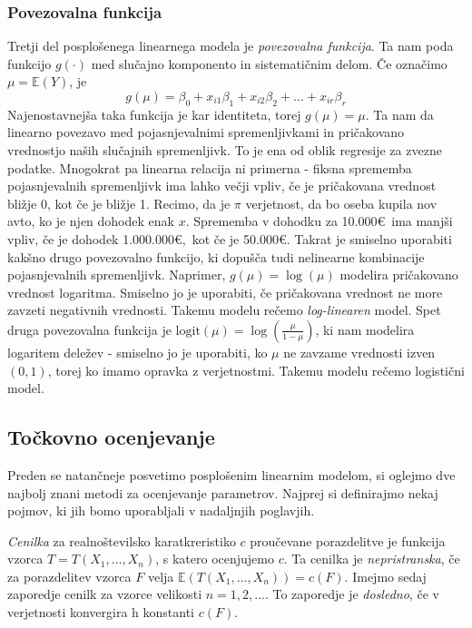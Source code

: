 \documentclass[12pt,a4paper]{amsart}
\theoremstyle{definition} %
\theoremstyle{plain} %
\begin{document}
\subsubsection{Povezovalna funkcija}
Tretji del posplošenega linearnega modela je \textit{povezovalna funkcija}. Ta nam poda funkcijo $g(\cdot)$ med slučajno komponento
in sistematičnim delom. Če označimo $\mu = \mathbb{E}(Y)$, je
\[
    g(\mu) = \beta_{0} + x_{i1}\beta_{1} + x_{i2}\beta_{2} + \ldots + x_{ir}\beta_{r}
\]
Najenostavnejša taka funkcija je kar identiteta, torej $g(\mu) = \mu$. Ta nam da linearno povezavo med pojasnjevalnimi spremenljivkami 
in pričakovano vrednostjo naših slučajnih spremenljivk. To je ena od oblik regresije za zvezne podatke.
Mnogokrat pa linearna relacija ni primerna - fiksna sprememba pojasnjevalnih spremenljivk ima lahko večji vpliv, če je pričakovana vrednost 
bližje 0, kot če je bližje 1. Recimo, da je $\pi$ verjetnost, da bo oseba kupila nov avto, ko je njen dohodek enak $x$. Sprememba v dohodku
za 10.000\euro~ima manjši vpliv, če je dohodek 1.000.000\euro,~kot če je 50.000\euro.
Takrat je smiselno uporabiti kakšno drugo povezovalno funkcijo, ki dopušča tudi nelinearne kombinacije pojasnjevalnih
spremenljivk. Naprimer, $g(\mu) = \log(\mu)$ modelira
pričakovano vrednost logaritma. Smiselno jo je uporabiti, če pričakovana vrednost ne more zavzeti negativnih vrednosti. Takemu modelu rečemo
\textit{log-linearen} model.
Spet druga povezovalna funkcija je $\mathrm{logit}(\mu) = \log(\frac{\mu}{1-\mu})$, ki nam modelira logaritem deležev - smiselno jo je uporabiti, 
ko $\mu$ ne zavzame vrednosti izven $(0,1)$, torej ko imamo opravka z verjetnostmi. Takemu modelu rečemo logistični model.
\subsection{Točkovno ocenjevanje}
Preden se natančneje posvetimo posplošenim linearnim modelom, si oglejmo dve najbolj znani metodi za ocenjevanje parametrov.
Najprej si definirajmo nekaj pojmov, ki jih bomo uporabljali v nadaljnjih poglavjih.

\textit{Cenilka} za realnoštevilsko karatkreristiko $c$ proučevane porazdelitve je funkcija vzorca $T=T(X_{1},\ldots,X_{n})$, s katero ocenjujemo $c.$
Ta cenilka je \textit{nepristranska}, če za porazdelitev vzorca $F$ velja $\mathbb{E}(T(X_{1},\ldots,X_{n})) = c(F).$
Imejmo sedaj zaporedje cenilk za vzorce velikosti $n=1,2,\ldots.$ To zaporedje je \textit{dosledno}, če v verjetnosti konvergira h konstanti $c(F).$
\end{document}
